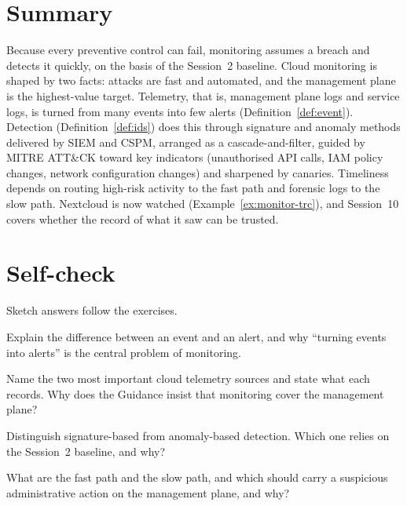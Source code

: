 \section{Summary}

Because every preventive control can fail, monitoring assumes a breach and
detects it quickly, on the basis of the Session~2 baseline. Cloud
monitoring is shaped by two facts: attacks are fast and automated, and the
management plane is the highest-value target. Telemetry, that is,
management plane logs and service logs, is turned from many events into few
alerts (Definition~\ref{def:event}). Detection (Definition~\ref{def:ids})
does this through signature and anomaly methods delivered by SIEM and CSPM,
arranged as a cascade-and-filter, guided by MITRE ATT\&CK toward key
indicators (unauthorised API calls, IAM policy changes, network
configuration changes) and sharpened by canaries. Timeliness depends on
routing high-risk activity to the fast path and forensic logs to the slow
path. Nextcloud is now watched (Example~\ref{ex:monitor-trc}), and Session~10
covers whether the record of what it saw can be trusted.

\section*{Self-check}

Sketch answers follow the exercises.

\begin{exercise}
Explain the difference between an event and an alert, and why ``turning
events into alerts'' is the central problem of monitoring.
\end{exercise}

\begin{exercise}
Name the two most important cloud telemetry sources and state what each
records. Why does the Guidance insist that monitoring cover the management
plane?
\end{exercise}

\begin{exercise}
Distinguish signature-based from anomaly-based detection. Which one relies on
the Session~2 baseline, and why?
\end{exercise}

\begin{exercise}
What are the fast path and the slow path, and which should carry a suspicious
administrative action on the management plane, and why?
\end{exercise}


